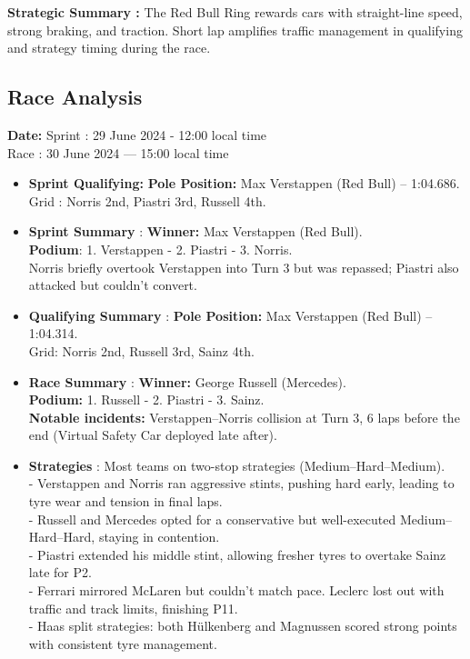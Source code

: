 \textbf{Strategic Summary :}
The Red Bull Ring rewards cars with straight-line speed, strong braking, and traction. Short lap amplifies traffic management in qualifying and strategy timing during the race.


\subsection{Race Analysis}

\textbf{Date:} Sprint : 29 June 2024 - 12:00 local time\\
Race : 30 June 2024 — 15:00 local time 

\begin{itemize}
    \item \textbf{Sprint Qualifying:} \textbf{Pole Position:} Max Verstappen (Red Bull) – 1:04.686.\\
    Grid : Norris 2nd, Piastri 3rd, Russell 4th.

    \item \textbf{Sprint Summary} : \textbf{Winner:} Max Verstappen (Red Bull). \\
    \textbf{Podium}: 1. Verstappen - 2. Piastri - 3. Norris. \\
    Norris briefly overtook Verstappen into Turn 3 but was repassed; Piastri also attacked but couldn’t convert.
    
    \item \textbf{Qualifying Summary} : \textbf{Pole Position:} Max Verstappen (Red Bull) – 1:04.314. \\
    Grid: Norris 2nd, Russell 3rd, Sainz 4th.
    
    \item \textbf{Race Summary} : \textbf{Winner:} George Russell (Mercedes).\\
    \textbf{Podium:} 1. Russell - 2. Piastri - 3. Sainz.\\
    \textbf{Notable incidents:} Verstappen–Norris collision at Turn 3, 6 laps before the end (Virtual Safety Car deployed late after).
    
    \item \textbf{Strategies} : Most teams on two-stop strategies (Medium–Hard–Medium).\\
    - Verstappen and Norris ran aggressive stints, pushing hard early, leading to tyre wear and tension in final laps. \\
    - Russell and Mercedes opted for a conservative but well-executed Medium–Hard–Hard, staying in contention. \\
    - Piastri extended his middle stint, allowing fresher tyres to overtake Sainz late for P2. \\
    - Ferrari mirrored McLaren but couldn’t match pace. Leclerc lost out with traffic and track limits, finishing P11.\\
    - Haas split strategies: both Hülkenberg and Magnussen scored strong points with consistent tyre management.
    

\end{itemize}
